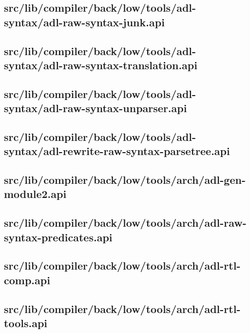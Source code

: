 \subsection{src/lib/compiler/back/low/tools/adl-syntax/adl-raw-syntax-junk.api}


\subsection{src/lib/compiler/back/low/tools/adl-syntax/adl-raw-syntax-translation.api}


\subsection{src/lib/compiler/back/low/tools/adl-syntax/adl-raw-syntax-unparser.api}


\subsection{src/lib/compiler/back/low/tools/adl-syntax/adl-rewrite-raw-syntax-parsetree.api}


\subsection{src/lib/compiler/back/low/tools/arch/adl-gen-module2.api}


\subsection{src/lib/compiler/back/low/tools/arch/adl-raw-syntax-predicates.api}


\subsection{src/lib/compiler/back/low/tools/arch/adl-rtl-comp.api}


\subsection{src/lib/compiler/back/low/tools/arch/adl-rtl-tools.api}


